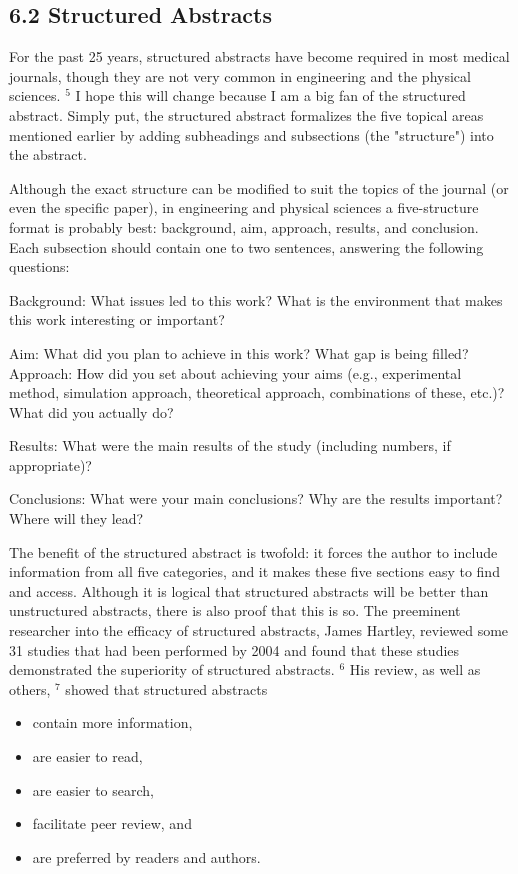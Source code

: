 \subsection*{6.2 Structured Abstracts}
For the past 25 years, structured abstracts have become required in most medical journals, though they are not very common in engineering and the physical sciences. ${ }^{5}$ I hope this will change because I am a big fan of the structured abstract. Simply put, the structured abstract formalizes the five topical areas mentioned earlier by adding subheadings and subsections (the "structure") into the abstract.

Although the exact structure can be modified to suit the topics of the journal (or even the specific paper), in engineering and physical sciences a five-structure format is probably best: background, aim, approach, results, and conclusion. Each subsection should contain one to two sentences, answering the following questions:

Background: What issues led to this work? What is the environment that makes this work interesting or important?

Aim: What did you plan to achieve in this work? What gap is being filled? Approach: How did you set about achieving your aims (e.g., experimental method, simulation approach, theoretical approach, combinations of these, etc.)? What did you actually do?

Results: What were the main results of the study (including numbers, if appropriate)?

Conclusions: What were your main conclusions? Why are the results important? Where will they lead?

The benefit of the structured abstract is twofold: it forces the author to include information from all five categories, and it makes these five sections easy to find and access. Although it is logical that structured abstracts will be better than unstructured abstracts, there is also proof that this is so. The preeminent researcher into the efficacy of structured abstracts, James Hartley, reviewed some 31 studies that had been performed by 2004 and found that these studies demonstrated the superiority of structured abstracts. ${ }^{6}$ His review, as well as others, ${ }^{7}$ showed that structured abstracts

\begin{itemize}
  \item contain more information,
  \item are easier to read,
  \item are easier to search,
  \item facilitate peer review, and
  \item are preferred by readers and authors.
\end{itemize}

